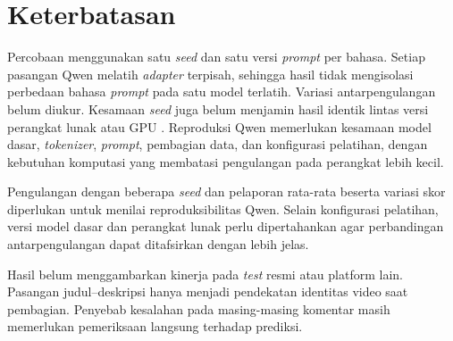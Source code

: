 \documentclass[11pt]{article}
\begin{document}
\section*{Keterbatasan}
Percobaan menggunakan satu \textit{seed} dan satu versi \textit{prompt} per bahasa. Setiap pasangan Qwen melatih \textit{adapter} terpisah, sehingga hasil tidak mengisolasi perbedaan bahasa \textit{prompt} pada satu model terlatih. Variasi antarpengulangan belum diukur. Kesamaan \textit{seed} juga belum menjamin hasil identik lintas versi perangkat lunak atau GPU \citep{pytorch-reproducibility}. Reproduksi Qwen memerlukan kesamaan model dasar, \textit{tokenizer}, \textit{prompt}, pembagian data, dan konfigurasi pelatihan, dengan kebutuhan komputasi yang membatasi pengulangan pada perangkat lebih kecil.

Pengulangan dengan beberapa \textit{seed} dan pelaporan rata-rata beserta variasi skor diperlukan untuk menilai reproduksibilitas Qwen. Selain konfigurasi pelatihan, versi model dasar dan perangkat lunak perlu dipertahankan agar perbandingan antarpengulangan dapat ditafsirkan dengan lebih jelas.

Hasil belum menggambarkan kinerja pada \textit{test} resmi atau platform lain. Pasangan judul--deskripsi hanya menjadi pendekatan identitas video saat pembagian. Penyebab kesalahan pada masing-masing komentar masih memerlukan pemeriksaan langsung terhadap prediksi.


\end{document}
